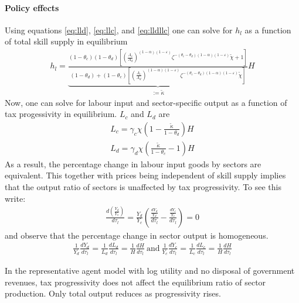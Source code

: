 \paragraph{Policy effects}
Using equations \ref{eq:lld}, \ref{eq:llc}, and \ref{eq:lldllc} one can solve for $h_l$ as a function of total skill supply in equilibrium
\begin{align}
h_l= \underbrace{\frac{(1-\theta_c)(1-\theta_d)\left[\left(\frac{A_c}{A_d}\right)^{(1-\alpha)(1-\varepsilon)}\zeta^{-(\theta_c-\theta_d)(1-\alpha)(1-\varepsilon)}\tilde{\chi}+1\right]}{(1-\theta_d)+(1-\theta_c)\left[\left(\frac{A_c}{A_d}\right)^{(1-\alpha)(1-\varepsilon)}\zeta^{-(\theta_c-\theta_d)(1-\alpha)(1-\varepsilon)}\tilde{\chi}\right]}}_{:=\tilde{\kappa}}H
\end{align}
Now, one can solve for labour input and sector-specific output as a function of tax progessivity  in equilibrium. 
$L_c$ and $L_d$ are
\begin{align}
L_c= \gamma_c \chi \left(1-\frac{\tilde{\kappa}}{1-\theta_d}\right)H\\
L_d= \gamma_d \chi \left(\frac{\tilde{\kappa}}{1-\theta_c}-1\right)H
\end{align}
As a result, the percentage change in labour input goods by sectors are equivalent. This together with prices being independent of skill supply implies that the output ratio of sectors is unaffected by tax progressivity.
To see this write:
\begin{align}
\frac{d\left(\frac{Y_d}{Y_s}\right)}{d \tau_l}=\frac{Y_d}{Y_c}\left(\frac{\frac{dY_d}{Y_d}}{d \tau_l}-\frac{\frac{dY_c}{Y_c}}{d \tau_l}\right)=0
\end{align}
and observe that the percentage change in sector output is homogeneous. 
\begin{align}
\frac{1}{Y_d}\frac{dY_d}{d \tau_l}= \frac{1}{L_d}\frac{d L_d}{d \tau_l}=\frac{1}{H}\frac{d H}{d \tau_l}\ \text{and} \ \frac{1}{Y_c}\frac{dY_c}{d \tau_l}= \frac{1}{L_c}\frac{d L_c}{d \tau_l}=\frac{1}{H}\frac{d H}{d \tau_l} 
\end{align}

\begin{prop}
	In the representative agent model with log utility and no disposal of government revenues, tax progressivity does not affect the equilibrium ratio of sector production. Only total output reduces as progressivity rises. 
\end{prop}

